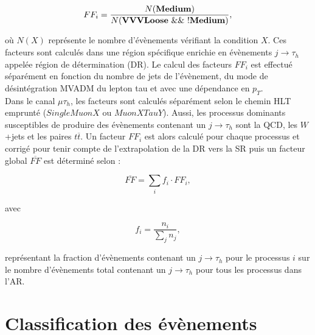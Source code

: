 \begin{equation}
    FF_i=\frac{N(\vb{Medium})}{N(\vb{VVVLoose}~\&\&~!\vb{Medium})},
\end{equation}

où $N(X)$ représente le nombre d'évènements vérifiant la condition $X$. Ces facteurs sont calculés dans une région spécifique enrichie en évènements $j\rightarrow\tau_h$ appelée région de détermination (DR). Le calcul des facteurs $FF_i$ est effectué séparément en fonction du nombre de jets de l'évènement, du mode de désintégration MVADM du lepton tau et avec une dépendance en $p_T$. \\

Dans le canal $\mu\tau_h$, les facteurs sont calculés séparément selon le chemin HLT emprunté ($SingleMuonX$ ou $MuonXTauY$). Aussi, les processus dominants susceptibles de produire des évènements contenant un $j\rightarrow\tau_h$ sont la QCD, les $W$ +jets et les paires $t\overline{t}$. Un facteur $FF_i$ est alors calculé pour chaque processus et corrigé pour tenir compte de l'extrapolation de la DR vers la SR puis un facteur global $\overline{FF}$ est déterminé selon :

\begin{equation}
    \overline{FF}=\sum_if_i\cdot FF_i,
\end{equation}

avec

\begin{equation}
    f_i=\frac{n_i}{\sum_j n_j},
\end{equation}

représentant la fraction d'évènements contenant un $j\rightarrow\tau_h$ pour le processus $i$ sur le nombre d'évènements total contenant un $j\rightarrow\tau_h$ pour tous les processus dans l'AR.  

\section{Classification des évènements}
\label{BDTclassifier}



